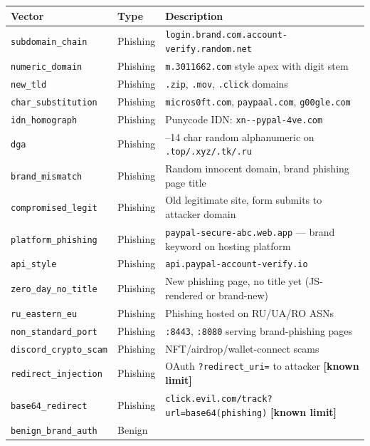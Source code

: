 \documentclass[11pt,a4paper]{article}
\newcommand{\code}[1]{\texttt{#1}}
\begin{document}
\begin{table}[h]
\centering
\small
\begin{tabularx}{\textwidth}{>{\raggedright}p{4.0cm}
                              >{\raggedright}p{1.5cm}
                              >{\raggedright\arraybackslash}X}
\toprule
Vector & Type & Description \\
\midrule
\code{subdomain\_chain}     & Phishing &
  \code{login.brand.com.account-verify.random.net} \\
\code{numeric\_domain}      & Phishing &
  \code{m.3011662.com} style apex with digit stem \\
\code{new\_tld}             & Phishing &
  \code{.zip}, \code{.mov}, \code{.click} domains \\
\code{char\_substitution}   & Phishing &
  \code{micros0ft.com}, \code{paypaal.com}, \code{g00gle.com} \\
\code{idn\_homograph}       & Phishing &
  Punycode IDN: \code{xn-{}-pypal-4ve.com} \\
\code{dga}                  & Phishing &
  7--14 char random alphanumeric on \code{.top/.xyz/.tk/.ru} \\
\code{brand\_mismatch}      & Phishing &
  Random innocent domain, brand phishing page title \\
\code{compromised\_legit}   & Phishing &
  Old legitimate site, form submits to attacker domain \\
\code{platform\_phishing}   & Phishing &
  \code{paypal-secure-abc.web.app} --- brand keyword on hosting
  platform \\
\code{api\_style}           & Phishing &
  \code{api.paypal-account-verify.io} \\
\code{zero\_day\_no\_title} & Phishing &
  New phishing page, no title yet (JS-rendered or brand-new) \\
\code{ru\_eastern\_eu}      & Phishing &
  Phishing hosted on RU/UA/RO ASNs \\
\code{non\_standard\_port}  & Phishing &
  \code{:8443}, \code{:8080} serving brand-phishing pages \\
\code{discord\_crypto\_scam} & Phishing &
  NFT/airdrop/wallet-connect scams \\
\code{redirect\_injection}  & Phishing &
  OAuth \code{?redirect\_uri=} to attacker \textbf{[known limit]} \\
\code{base64\_redirect}     & Phishing &
  \code{click.evil.com/track?url=base64(phishing)} \textbf{[known
  limit]} \\
\midrule
\code{benign\_brand\_auth}  & Benign &

\end{tabularx}
\end{table}
\end{document}

